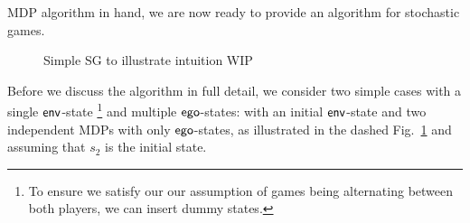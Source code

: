 
MDP algorithm in hand, we are now ready to provide an algorithm for
stochastic games.


\begin{figure}
\centering
{}
\caption{Simple SG to illustrate intuition {\color{red}WIP}}
\label{fig:sg:simplest}
\end{figure}

Before we discuss the algorithm in full detail, we consider two simple cases with a single $\mathsf{env}$-state \footnote{To ensure we satisfy our our assumption of games being alternating between both players, we can insert dummy states.} and multiple $\mathsf{ego}$-states: with an initial $\mathsf{env}$-state and two independent MDPs with only $\mathsf{ego}$-states, \color{red} as illustrated in the dashed Fig.~\ref{fig:sg:simplest} and assuming that $s_2$ is the initial state.

